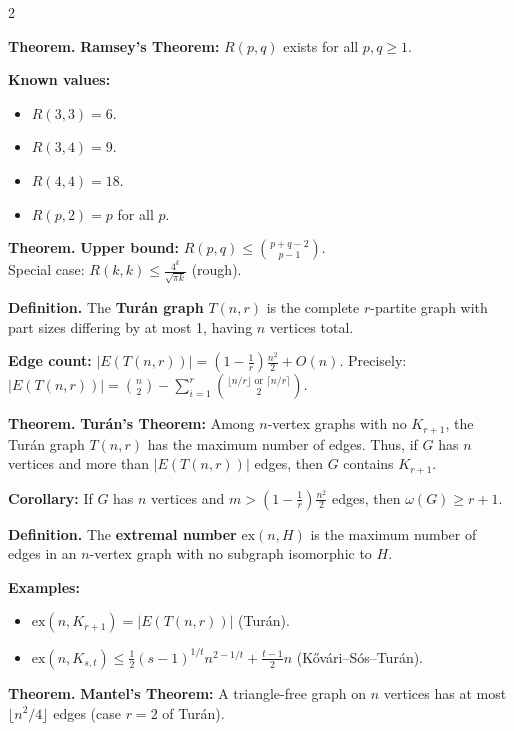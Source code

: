 \documentclass[8pt,landscape,a4paper]{extarticle}
\newcommand{\thm}[1]{\begin{mdframed}[style=theorembox]\textbf{Theorem.} #1\end{mdframed}}
\newcommand{\defn}[1]{\begin{mdframed}[style=defbox]\textbf{Definition.} #1\end{mdframed}}
\begin{document}
\begin{multicols}{2}
\thm{\textbf{Ramsey's Theorem:} $R(p,q)$ exists for all $p,q \geq 1$.}

\textbf{Known values:}
\begin{itemize}[nosep]
    \item $R(3,3) = 6$.
    \item $R(3,4) = 9$.
    \item $R(4,4) = 18$.
    \item $R(p,2) = p$ for all $p$.
\end{itemize}

\thm{\textbf{Upper bound:} $R(p,q) \leq \binom{p+q-2}{p-1}$.\\
Special case: $R(k,k) \leq \frac{4^k}{\sqrt{\pi k}}$ (rough).}

\defn{The \textbf{Turán graph} $T(n,r)$ is the complete $r$-partite graph with part sizes differing by at most 1, having $n$ vertices total.}

\textbf{Edge count:} $|E(T(n,r))| = \left(1 - \frac{1}{r}\right)\frac{n^2}{2} + O(n)$. Precisely: $|E(T(n,r))| = \binom{n}{2} - \sum_{i=1}^r \binom{\lfloor n/r \rfloor \text{ or } \lceil n/r \rceil}{2}$.

\thm{\textbf{Turán's Theorem:} Among $n$-vertex graphs with no $K_{r+1}$, the Turán graph $T(n,r)$ has the maximum number of edges. Thus, if $G$ has $n$ vertices and more than $|E(T(n,r))|$ edges, then $G$ contains $K_{r+1}$.}

\textbf{Corollary:} If $G$ has $n$ vertices and $m > \left(1 - \frac{1}{r}\right)\frac{n^2}{2}$ edges, then $\omega(G) \geq r+1$.

\defn{The \textbf{extremal number} $\text{ex}(n, H)$ is the maximum number of edges in an $n$-vertex graph with no subgraph isomorphic to $H$.}

\textbf{Examples:}
\begin{itemize}[nosep]
    \item $\text{ex}(n, K_{r+1}) = |E(T(n,r))|$ (Turán).
    \item $\text{ex}(n, K_{s,t}) \leq \frac{1}{2}(s-1)^{1/t} n^{2-1/t} + \frac{t-1}{2}n$ (Kővári–Sós–Turán).
\end{itemize}

\thm{\textbf{Mantel's Theorem:} A triangle-free graph on $n$ vertices has at most $\lfloor n^2/4 \rfloor$ edges (case $r=2$ of Turán).}

\end{multicols}
\end{document}

